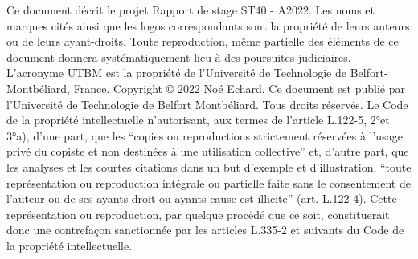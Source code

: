 Ce document décrit le projet Rapport de stage ST40 - A2022.
\newline
\newline
Les noms et marques cités ainsi que les logos correspondants sont la propriété de leurs auteurs ou de leurs ayant-droits. Toute reproduction, même partielle des éléments de ce document donnera systématiquement lieu à des poursuites judiciaires. L’acronyme UTBM est la propriété de l’Université de Technologie de Belfort-Montbéliard, France.
 \newline
 \newline
 \newline
 \newline
Copyright © 2022 Noé Echard.
\newline
\newline
Ce document est publié par l’Université de Technologie de Belfort Montbéliard. Tous droits réservés.
\newline
\newline
Le Code de la propriété intellectuelle n’autorisant, aux termes de l’article L.122-5, 2°et 3°a), d’une part, que les “copies ou reproductions strictement réservées à l’usage privé du copiste et non destinées à une utilisation collective” et, d’autre part, que les analyses et les courtes citations dans un but d’exemple et d’illustration, “toute représentation ou reproduction intégrale ou partielle faite sans le consentement de l’auteur ou de ses ayants droit ou ayants cause est illicite” (art. L.122-4).
\newline
\newline
Cette représentation ou reproduction, par quelque procédé que ce soit, constituerait donc une contrefaçon sanctionnée par les articles L.335-2 et suivants du Code de la propriété intellectuelle.
\newpage
\thispagestyle{empty}
\mbox{}
\newpage